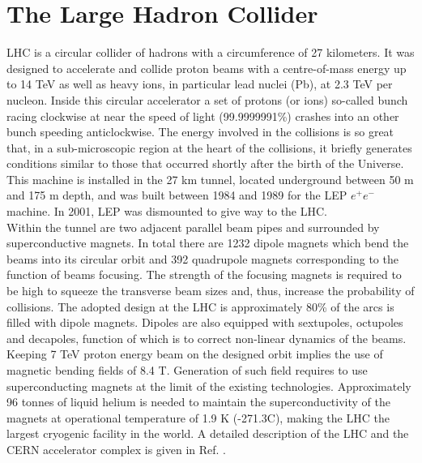 \section{The Large Hadron Collider}
\label{chap2:LHC}
LHC is a circular collider of hadrons with a circumference of 27 kilometers. It was designed to accelerate and collide proton beams with a centre-of-mass energy up to 14 TeV as well as heavy ions, in particular lead nuclei (Pb), at 2.3 TeV per nucleon. Inside this circular accelerator a set of protons (or ions) so-called bunch racing clockwise at near the speed of light (99.9999991\%) crashes into an other bunch speeding anticlockwise. The energy involved in the collisions is so great that, in a sub-microscopic region at the heart of the collisions, it briefly generates conditions similar to those that occurred shortly after the birth of the Universe. This machine is installed in the 27 km tunnel, located underground between 50 m and 175 m depth, and was built between 1984 and 1989 for the LEP $e^+e^-$ machine. In 2001, LEP was dismounted to give way to the LHC. \\ 
Within the tunnel are two adjacent parallel beam pipes and surrounded by superconductive magnets. In total there are 1232 dipole magnets which bend the beams into its circular orbit and 392 quadrupole magnets corresponding to the function of beams focusing. The strength of the focusing magnets is required to be high to squeeze the transverse beam sizes and, thus, increase the probability of collisions. The adopted design at the LHC is approximately 80\% of the arcs is filled with dipole magnets. Dipoles are also equipped with sextupoles, octupoles and decapoles, function of which is to correct non-linear dynamics of the beams.  Keeping 7 TeV proton energy beam on the designed orbit implies the use of magnetic bending fields of 8.4 T. Generation of such field requires to use superconducting magnets at the limit of the existing technologies. Approximately 96 tonnes of liquid helium is needed to maintain the superconductivity of the magnets at  operational temperature of 1.9 K (-271.3C), making the LHC the largest cryogenic facility in the world.  A detailed description of the LHC and the CERN accelerator complex is given in Ref. \cite{LHCTDR}.

